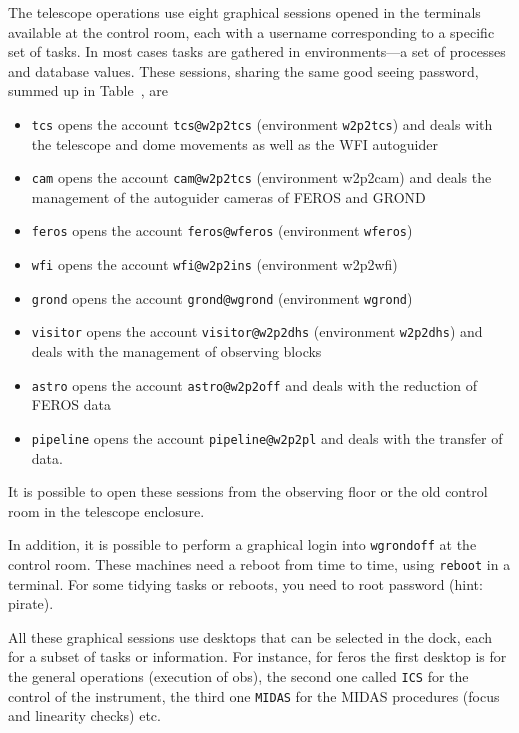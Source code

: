 \documentclass[11pt,fleqn,a4paper]{book}
\begin{document}
The telescope operations use eight graphical sessions opened in the terminals available at the control room, each with a username corresponding to a specific set of tasks. In most cases tasks are gathered in environments---a set of processes and database values. These sessions, sharing the same good seeing password, summed up in Table~, are
\begin{itemize}
    \item \texttt{tcs} opens the account \texttt{tcs@\gls{w2p2tcs}} (environment \texttt{w2p2tcs}) and deals with the telescope and dome movements as well as the WFI autoguider
    \item \texttt{cam} opens the account \texttt{cam@\gls{w2p2tcs}} (environment \gls{w2p2cam}) and deals the management of the autoguider cameras of FEROS and GROND
    \item \texttt{feros} opens the account \texttt{feros@\gls{wferos}} (environment \texttt{wferos})
    \item \texttt{wfi} opens the account \texttt{wfi@\gls{w2p2ins}} (environment \gls{w2p2wfi})
    \item \texttt{grond} opens the account \texttt{grond@\gls{wgrond}} (environment \texttt{wgrond})
    \item \texttt{visitor} opens the account \texttt{visitor@\gls{w2p2dhs}} (environment \texttt{w2p2dhs}) and deals with the management of observing blocks
    \item \texttt{astro} opens the account \texttt{astro@\gls{w2p2off}} and deals with the reduction of FEROS data
    \item \texttt{pipeline} opens the account \texttt{pipeline@\gls{w2p2pl}} and deals with the transfer of data.
\end{itemize}
It is possible to open these sessions from the observing floor or the old control room in the telescope enclosure.

In addition, it is possible to perform a graphical login into \texttt{wgrondoff} at the control room.  These machines need a reboot from time to time, using \texttt{reboot} in a terminal. For some tidying tasks or reboots, you need to root password (hint: pirate). 

All these graphical sessions use \glspl{desktop} that can be selected in the dock, each for a subset of tasks or information.  For instance, for \gls{feros} the first desktop is for the general operations (execution of \glspl{ob}), the second one called \texttt{ICS} for the control of the instrument, the third one \texttt{MIDAS} for the MIDAS procedures (focus and linearity checks) etc.
\end{document}
